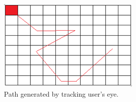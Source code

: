 \documentclass[10pt,twocolumn,letterpaper]{article}
\begin{document}
\begin{figure}
  \begin{center}
    \includegraphics[width=\linewidth]{predicted_object_path}
  \end{center}
  \caption{Path generated by tracking user’s eye.}
  \label{fig:generatedpath}
\end{figure}
\end{document}
